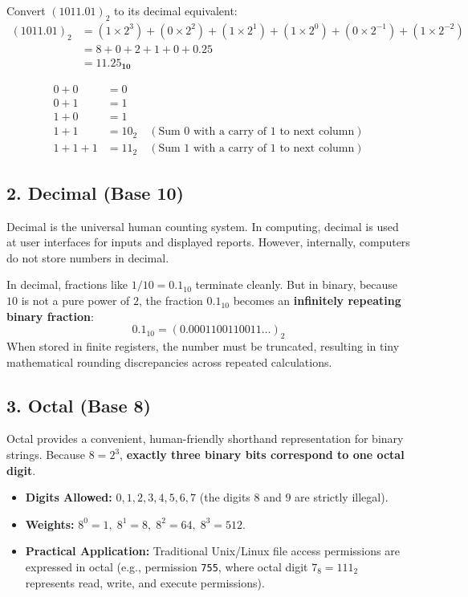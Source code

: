 \begin{example}
Convert $(1011.01)_2$ to its decimal equivalent:
\begin{align*}
(1011.01)_2 &= (1 \times 2^3) + (0 \times 2^2) + (1 \times 2^1) + (1 \times 2^0) + (0 \times 2^{-1}) + (1 \times 2^{-2}) \\
&= 8 + 0 + 2 + 1 + 0 + 0.25 \\
&= \mathbf{11.25_{10}}
\end{align*}
\end{example}

\begin{definition}
\begin{align*}
0 + 0 &= 0 \\
0 + 1 &= 1 \\
1 + 0 &= 1 \\
1 + 1 &= 10_2 \quad (\text{Sum } 0 \text{ with a carry of } 1 \text{ to next column}) \\
1 + 1 + 1 &= 11_2 \quad (\text{Sum } 1 \text{ with a carry of } 1 \text{ to next column})
\end{align*}
\end{definition}

\subsection{2. Decimal (Base 10)}
Decimal is the universal human counting system. In computing, decimal is used at user interfaces for inputs and displayed reports. However, internally, computers do not store numbers in decimal. 

\begin{examalert}
In decimal, fractions like $1/10 = 0.1_{10}$ terminate cleanly. But in binary, because $10$ is not a pure power of $2$, the fraction $0.1_{10}$ becomes an \textbf{infinitely repeating binary fraction}:
\[
0.1_{10} = (0.0001100110011\dots)_2
\]
When stored in finite registers, the number must be truncated, resulting in tiny mathematical rounding discrepancies across repeated calculations.
\end{examalert}

\subsection{3. Octal (Base 8)}
Octal provides a convenient, human-friendly shorthand representation for binary strings. Because $8 = 2^3$, \textbf{exactly three binary bits correspond to one octal digit}.
\begin{itemize}[leftmargin=1.2em]
    \item \textbf{Digits Allowed:} $0, 1, 2, 3, 4, 5, 6, 7$ (the digits $8$ and $9$ are strictly illegal).
    \item \textbf{Weights:} $8^0 = 1, \; 8^1 = 8, \; 8^2 = 64, \; 8^3 = 512$.
    \item \textbf{Practical Application:} Traditional Unix/Linux file access permissions are expressed in octal (e.g., permission \texttt{755}, where octal digit $7_8 = 111_2$ represents read, write, and execute permissions).
\end{itemize}

